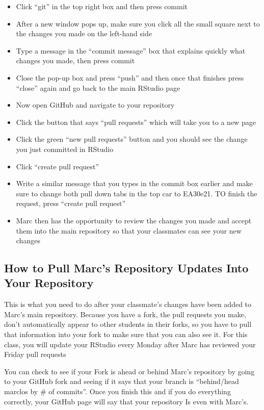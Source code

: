 \documentclass[12pt]{../SOP4_alpha}\usepackage[]{graphicx}\usepackage[]{xcolor}
\begin{document}
\begin{itemize}

\item Click ``git'' in the top right box and then press commit
  \item After a new window pops up, make sure you click all the small square next to the changes you made on the left-hand side 
\item Type a message in the ``commit message'' box that explains quickly what changes you made, then press commit
  \item Close the pop-up box and press ``push'' and then once that finishes press ``close'' again and go back to the main RStudio page
\item Now open GitHub and navigate to your repository 
  \item Click the button that says ``pull requests'' which will take you to a new page
  \item Click the green ``new pull requests'' button and you should see the change you just committed in RStudio
  \item Click ``create pull request''
  \item Write a similar message that you types in the commit box earlier and make sure to change both pull down tabs in the top car to EA30e21. TO finish the request, press ``create pull request'' 
  \item Marc then has the opportunity to review the changes you made and accept them into the main repository so that your classmates can see your new changes

\end{itemize}


\subsection{How to Pull Marc's Repository Updates Into Your Repository}

This is what you need to do after your classmate's changes have been added to Marc's main repository. Because you have a fork, the pull requests you make, don't automatically appear to other students in their forks, so you have to pull that information into your fork to make sure that you can also see it. For this class, you will update your RStudio every Monday after Marc has reviewed your Friday pull requests

You can check to see if your Fork is ahead or behind Marc's repository by going to your GitHub fork and seeing if it says that your branch is ``behind/head marclos by \# of commits''. Once you finish this and if you do everything correctly, your GitHub page will say that your repository Is even with Marc's. 
\end{document}
